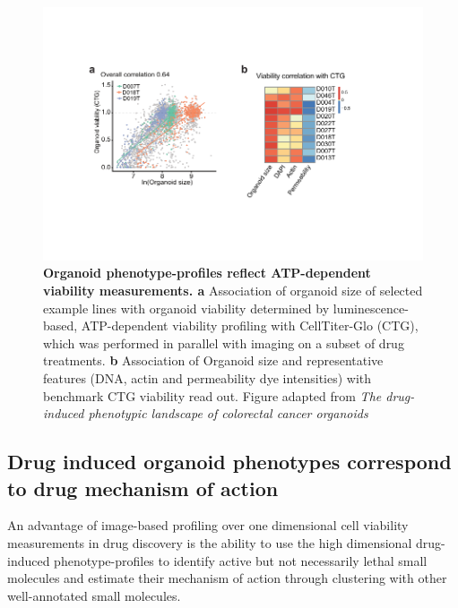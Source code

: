 \begin{flushleft}
\clearpage
\begin{figure}[h]
\centering
\includegraphics[width=\textwidth,
                height=\textheight,
                keepaspectratio]{figures/promise/pdf/fig_2_3_2.pdf}
\caption[Organoid phenotype-profiles reflect ATP-dependent viability measurements]{\textbf{Organoid phenotype-profiles reflect ATP-dependent viability measurements. a} Association of organoid size of selected example lines with organoid viability determined by luminescence-based, ATP-dependent viability profiling with CellTiter-Glo (CTG), which was performed in parallel with imaging on a subset of drug treatments. \textbf{b} Association of Organoid size and representative features (DNA, actin and permeability dye intensities) with benchmark CTG viability read out. Figure adapted from \textit{The drug-induced phenotypic landscape of colorectal cancer organoids} \citep{betgeDruginducedPhenotypicLandscape2022}}
\label{fig_223}
\end{figure}
\bigbreak

\subsection{Drug induced organoid phenotypes correspond to drug mechanism of action}

An advantage of image-based profiling over one dimensional cell viability measurements in drug discovery is the ability to use the high dimensional drug-induced phenotype-profiles to identify active but not necessarily lethal small molecules and estimate their mechanism of action through clustering with other well-annotated small molecules. 


\end{flushleft}
